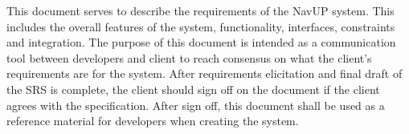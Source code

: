 This document serves to describe the requirements of the NavUP system. This includes the overall features of the system, functionality, interfaces, constraints and integration. The purpose of this document is intended as a communication tool between developers and client to reach consensus on what the client's requirements are for the system. After requirements elicitation and final draft of the SRS is complete, the client should sign off on the document if the client agrees with the specification. After sign off, this document shall be used as a reference material for developers when creating the system.
